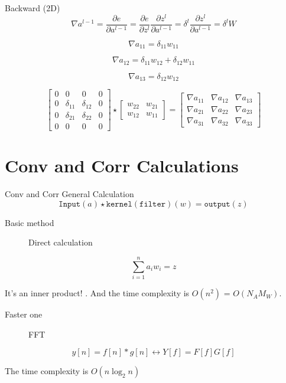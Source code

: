 \documentclass[aspectratio=1610,xcolor={dvipsnames},hyperref={colorlinks,unicode,linkcolor=violet,anchorcolor=BlueViolet,citecolor=YellowOrange,filecolor=black,urlcolor=Aquamarine}]{beamer}
\begin{document}
\begin{frame}[label={sec:org8706216}]{Backward (2D)}
\[\nabla a^{l-1} = \frac{\partial e}{\partial a^{l-1}} = \frac{\partial e}{\partial z^{l}} \frac{\partial z^{l}}{\partial a^{l-1}} = \delta^{l} \frac{\partial z^{l}}{\partial a^{l-1}} = \delta^{l} W\]

\[\nabla a_{11} = \delta_{11}w_{11}\]

\[\nabla a_{12} = \delta_{11}w_{12} + \delta_{12}w_{11}\]

\[\nabla a_{13} = \delta_{12}w_{12}\]

\begin{equation}
\begin{bmatrix}
0&0&0&0 \\
0&\delta_{11}& \delta_{12}&0\\
0&\delta_{21}&\delta_{22}&0 \\
0&0&0&0
\end{bmatrix} \star
\begin{bmatrix}
w_{22}&w_{21}\\
w_{12}&w_{11}
\end{bmatrix} =
\begin{bmatrix}
\nabla a_{11}&\nabla a_{12}&\nabla a_{13} \\
\nabla a_{21}&\nabla a_{22}&\nabla a_{23}\\
\nabla a_{31}&\nabla a_{32}&\nabla a_{33}
\end{bmatrix}
\end{equation}
\end{frame}

\section{Conv and Corr Calculations}
\label{sec:org09e342c}

\begin{frame}[label={sec:org9e5e436}]{Conv and Corr General Calculation}
\[\mathtt {Input}(a) \star \mathtt {kernel (filter)}(w) = \mathtt {output}(z)\]

\begin{description}
\item[{Basic method}] Direct calculation
\end{description}

\[\sum_{i=1}^{n} a_{i}w_{i} = z\]

It's an inner product! \(<A, W>\).  And the time complexity is \(O(n^{2})\) = \(O(N_{A} M_{W})\).

\begin{description}
\item[{Faster one}] FFT
\end{description}

\[y[n]=f[n]*g[n]\leftrightarrow Y[f]=F[f]G[f]\]

The time complexity is \(O(n\log_{2}n)\)
\end{frame}
\end{document}
